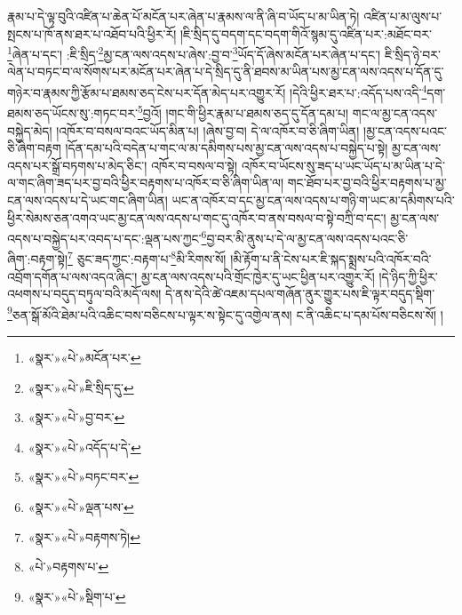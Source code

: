 རྣམ་པ་དེ་ལྟ་བུའི་འཛིན་པ་ཆེན་པོ་མངོན་པར་ཞེན་པ་རྣམས་ལ་ནི་ཞི་བ་ཡོད་པ་མ་ཡིན་ཏེ། འཛིན་པ་མ་ལུས་པ་སྤངས་པ་ཁོ་ནས་ཐར་པ་འཐོབ་པའི་ཕྱིར་རོ། །ཇི་སྲིད་དུ་བདག་དང་བདག་གིའོ་སྙམ་དུ་འཛིན་པར་:མཐོང་བར་\footnote{«སྣར་»«པེ་»མངོན་པར་}ཞེན་པ་དང་། :ཇི་སྲིད་\footnote{«སྣར་»«པེ་»ཇི་སྲིད་དུ་}མྱ་ངན་ལས་འདས་པ་ཞེས་:བྱ་བ་\footnote{«སྣར་»«པེ་»བྱ་བར་}ཡོད་དོ་ཞེས་མངོན་པར་ཞེན་པ་དང་། ཇི་སྲིད་ཉེ་བར་ལེན་པ་བཏང་བ་ལ་སོགས་པར་མངོན་པར་ཞེན་པ་དེ་སྲིད་དུ་ནི་ཐབས་མ་ཡིན་པས་མྱ་ངན་ལས་འདས་པ་དོན་དུ་གཉེར་བ་རྣམས་ཀྱི་རྩོམ་པ་ཐམས་ཅད་ངེས་པར་དོན་མེད་པར་འགྱུར་རོ། །དེའི་ཕྱིར་ཐར་པ་:འདོད་པས་འདི་\footnote{«སྣར་»«པེ་»འདོད་པ་དེ་}དག་ཐམས་ཅད་ཡོངས་སུ་:གཏང་བར་\footnote{«སྣར་»«པེ་»བཏང་བར་}བྱའོ། །གང་གི་ཕྱིར་རྣམ་པ་ཐམས་ཅད་དུ་དོན་དམ་པ། གང་ལ་མྱ་ངན་འདས་བསྐྱེད་མེད། །འཁོར་བ་བསལ་བའང་ཡོད་མིན་པ། །ཞེས་བྱ་བ། དེ་ལ་འཁོར་བ་ཅི་ཞིག་ཡིན། །མྱ་ངན་འདས་པའང་ཅི་ཞིག་བརྟག །དོན་དམ་པའི་བདེན་པ་གང་ལ་མ་དམིགས་པས་མྱ་ངན་ལས་འདས་པ་བསྐྱེད་པ་སྟེ། མྱ་ངན་ལས་འདས་པར་སྒྲོ་བཏགས་པ་མེད་ཅིང་། འཁོར་བ་བསལ་བ་སྟེ། འཁོར་བ་ཡོངས་སུ་ཟད་པ་ཡང་ཡོད་པ་མ་ཡིན་པ་དེ་ལ་གང་ཞིག་ཟད་པར་བྱ་བའི་ཕྱིར་བརྟགས་པ་འཁོར་བ་ཅི་ཞིག་ཡིན་ལ། གང་ཐོབ་པར་བྱ་བའི་ཕྱིར་བརྟགས་པ་མྱ་ངན་ལས་འདས་པ་དེ་ཡང་གང་ཞིག་ཡིན། ཡང་ན་འཁོར་བ་དང་མྱ་ངན་ལས་འདས་པ་གཉི་ག་ཡང་མ་དམིགས་པའི་ཕྱིར་སེམས་ཅན་འགའ་ཡང་མྱ་ངན་ལས་འདས་པ་གང་དུ་འཁོར་བ་ནས་བསལ་བ་སྟེ་བཀྲི་བ་དང་། མྱ་ངན་ལས་འདས་པ་བསྐྱེད་པར་འབད་པ་དང་:ལྡན་པས་ཀྱང་\footnote{«སྣར་»«པེ་»ལྡན་པས་}བྱ་བར་མི་ནུས་པ་དེ་ལ་མྱ་ངན་ལས་འདས་པའང་ཅི་ཞིག་:བརྟག་སྟེ།\footnote{«སྣར་»«པེ་»བརྟགས་ཏེ།} ཅུང་ཟད་ཀྱང་:བརྟག་པ་\footnote{«པེ་»བརྟགས་པ་}མི་རིགས་སོ། །མི་རྟོག་པ་ནི་ངེས་པར་ཇི་སྐད་སྨྲས་པའི་འཁོར་བའི་འབྲོག་དགོན་པ་ལས་འདའ་ཞིང་། མྱ་ངན་ལས་འདས་པའི་གྲོང་ཁྱེར་དུ་ཡང་ཕྱིན་པར་འགྱུར་རོ། །དེ་ཉིད་ཀྱི་ཕྱིར་འཕགས་པ་བདུད་བཏུལ་བའི་མདོ་ལས། དེ་ནས་དེའི་ཚེ་འཇམ་དཔལ་གཞོན་ནུར་གྱུར་པས་ཇི་ལྟར་བདུད་སྡིག་\footnote{«སྣར་»«པེ་»སྡིག་པ་}ཅན་སྒོ་མོའི་ཐེམ་པའི་འཆིང་བས་བཅིངས་པ་ལྟར་ས་སྟེང་དུ་འགྱེལ་ནས། ང་ནི་འཆིང་པ་དམ་པོས་བཅིངས་སོ། །
